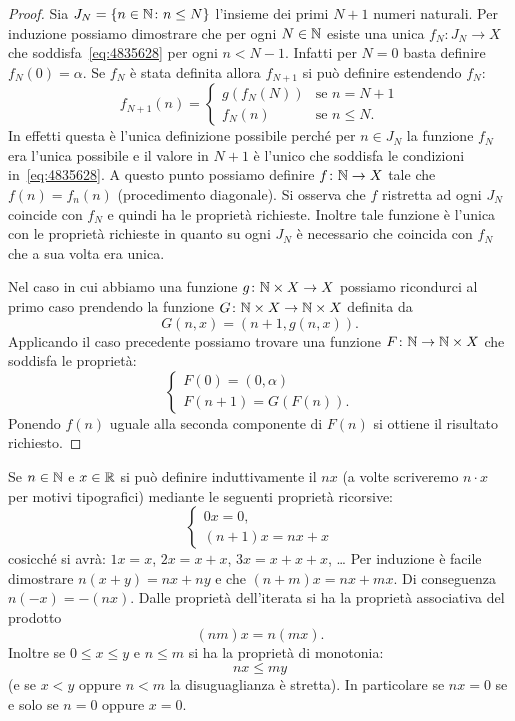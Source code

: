 \begin{proof}
Sia $J_N={\left\{ n\in \mathbb N \colon n\le N \right\}}$ l'insieme dei primi $N+1$ numeri naturali.
Per induzione possiamo dimostrare che per ogni $N\in \mathbb N$ esiste una unica
$f_N\colon J_N\to X$ che soddisfa~\eqref{eq:4835628} per ogni $n<N-1$.
Infatti per $N=0$ basta definire $f_N(0) = \alpha$. 
Se $f_N$ è stata definita allora $f_{N+1}$ si può definire 
estendendo $f_N$:
\[
f_{N+1}(n) = 
\begin{cases}
  g(f_N(N)) & \text{se $n=N+1$}\\
  f_N(n) & \text{se $n\le N$}.  
\end{cases}
\]
In effetti questa è l'unica definizione possibile perché per $n\in J_N$ 
la funzione 
$f_N$ era l'unica possibile e il valore in $N+1$ è l'unico 
che soddisfa le condizioni in~\eqref{eq:4835628}.
A questo punto possiamo definire $f\colon \mathbb N\to X$ 
tale che $f(n) = f_n(n)$
(procedimento diagonale).
Si osserva che $f$ ristretta ad ogni $J_N$ coincide con $f_N$
e quindi ha le proprietà richieste. Inoltre tale funzione è l'unica con le 
proprietà richieste in quanto su ogni $J_N$ è necessario che coincida con $f_N$
che a sua volta era unica.

Nel caso in cui abbiamo una funzione $g\colon \mathbb N\times X \to X$
possiamo ricondurci al primo caso prendendo la funzione 
$G\colon \mathbb N\times X \to \mathbb N\times X$ definita da 
\[
  G(n,x) = (n+1,g(n,x)).
\]
Applicando il caso precedente possiamo trovare una funzione $F\colon \mathbb N\to \mathbb N\times X$
che soddisfa le proprietà:
\[
 \begin{cases}
  F(0) = (0,\alpha)\\
  F(n+1) = G(F(n)).  
 \end{cases}
\]
Ponendo $f(n)$ uguale alla seconda componente di $F(n)$ si ottiene il risultato richiesto.
\end{proof}

Se $n\in \mathbb N$ e $x\in \mathbb R$ 
si può definire induttivamente il  $n x$
(a volte scriveremo $n\cdot x$ per motivi tipografici)
mediante le seguenti proprietà ricorsive:
\[
\begin{cases}
   0 x = 0,\\
   (n+1) x = n x + x
\end{cases}
\]
cosicché si avrà: $1x = x$, $2x=x+x$, $3x=x+x+x$, \dots
Per induzione è facile dimostrare $n(x+y) = nx + ny$ 
e che $(n+m)x = nx + mx$. 
Di conseguenza $n(-x) = -(n x)$.
Dalle proprietà dell'iterata si ha la proprietà associativa del prodotto
\[
 (nm)x = n(mx).  
\]
Inoltre se 
$0 \le x \le y$ e $n \le m$ si ha la proprietà di monotonia:
\[
  n x \le m y
\]
(e se $x<y$ oppure $n<m$ la disuguaglianza è stretta).
In particolare se $n x = 0$ se e solo se $n=0$ oppure $x=0$.

